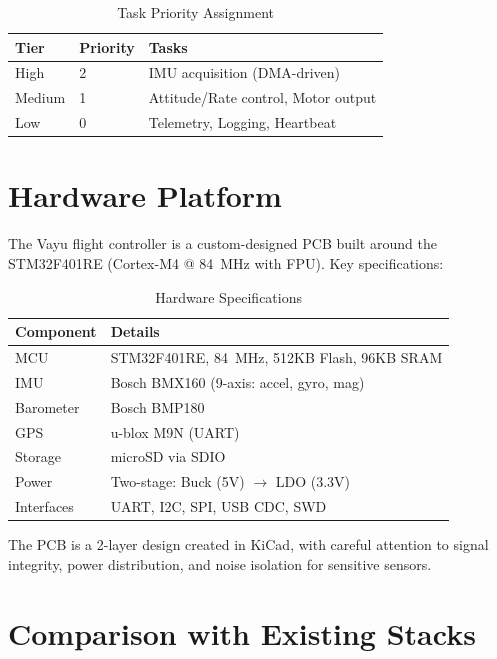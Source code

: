 \documentclass[11pt]{article}
\begin{document}
\begin{table}[H]
\centering
\caption{Task Priority Assignment}
\begin{tabular}{lll}
\toprule
\textbf{Tier} & \textbf{Priority} & \textbf{Tasks} \\
\midrule
High & 2 & IMU acquisition (DMA-driven) \\
Medium & 1 & Attitude/Rate control, Motor output \\
Low & 0 & Telemetry, Logging, Heartbeat \\
\bottomrule
\end{tabular}
\end{table}

\section{Hardware Platform}

The Vayu flight controller is a custom-designed PCB built around the STM32F401RE (Cortex-M4 @ 84~MHz with FPU). Key specifications:

\begin{table}[H]
\centering
\caption{Hardware Specifications}
\begin{tabular}{ll}
\toprule
\textbf{Component} & \textbf{Details} \\
\midrule
MCU & STM32F401RE, 84~MHz, 512KB Flash, 96KB SRAM \\
IMU & Bosch BMX160 (9-axis: accel, gyro, mag) \\
Barometer & Bosch BMP180 \\
GPS & u-blox M9N (UART) \\
Storage & microSD via SDIO \\
Power & Two-stage: Buck (5V) $\rightarrow$ LDO (3.3V) \\
Interfaces & UART, I2C, SPI, USB CDC, SWD \\
\bottomrule
\end{tabular}
\end{table}

The PCB is a 2-layer design created in KiCad, with careful attention to signal integrity, power distribution, and noise isolation for sensitive sensors.

\section{Comparison with Existing Stacks}
\end{document}
